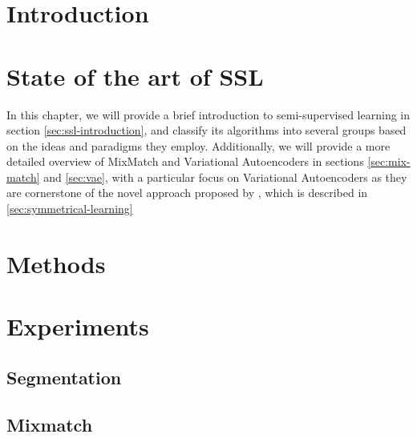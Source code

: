 \documentclass[twoside]{ctuthesis}
\theoremstyle{plain}
\theoremstyle{definition}
\theoremstyle{note}
\begin{document}
\maketitle

\chapter{Introduction}


\chapter{State of the art of SSL}
\label{motivation-theory}
In this chapter, we will provide a brief introduction to semi-supervised learning in section \ref{sec:ssl-introduction}, and classify its 
algorithms into several groups based on the ideas and paradigms they employ. Additionally, we will provide a more detailed overview of 
MixMatch and Variational Autoencoders in sections \ref{sec:mix-match} and \ref{sec:vae}, with a particular focus on Variational Autoencoders
as they are cornerstone of the novel approach proposed by \cite{}, which is described in \ref{sec:symmetrical-learning}






\chapter{Methods}
\label{methods}

\chapter{Experiments}
\label{experiments}

\section{Segmentation}

\section{Mixmatch}
\end{document}
